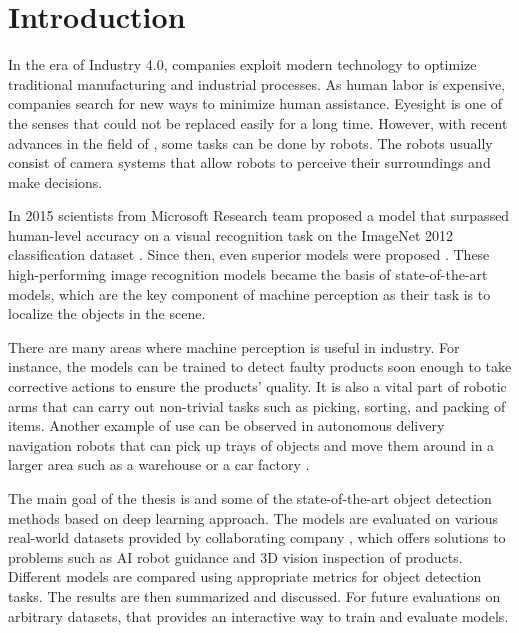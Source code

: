 \chapter{Introduction}

In the era of Industry 4.0, companies exploit modern technology to optimize
traditional manufacturing and industrial processes. As human labor is expensive,
companies search for new ways to minimize human assistance. Eyesight is one of
the senses that could not be replaced easily for a long time. However, with
recent advances in the field of , some tasks can be done by
robots. The robots usually consist of camera systems that allow robots to
perceive their surroundings and make decisions.

In 2015 scientists from Microsoft Research team proposed a 
model \cite{surp2015} that surpassed human-level accuracy on a visual
recognition task on the ImageNet 2012 classification dataset \cite{imagenet}.
Since then, even superior models were proposed \cite{resnet, efficientnet}.
These high-performing image recognition models became the basis of
state-of-the-art  models, which are the key component of
machine perception as their task is to localize the objects in the scene.

There are many areas where machine perception is useful in industry. For
instance, the models can be trained to detect faulty products soon enough to
take corrective actions to ensure the products' quality. It is also a vital part
of robotic arms that can carry out non-trivial tasks such as picking, sorting,
and packing of items. Another example of use can be observed in autonomous
delivery navigation robots that can pick up trays of objects and move them
around in a larger area such as a warehouse or a car factory \cite{bmw}.

The main goal of the thesis is  and  some of
the state-of-the-art object detection methods based on deep learning approach.
The models are evaluated on various real-world datasets provided by
collaborating company , which offers solutions to problems
such as AI robot guidance and 3D vision inspection of products. Different models
are compared using appropriate metrics for object detection tasks. The results
are then summarized and discussed. For future evaluations on arbitrary datasets,
 that provides an interactive way to train
and evaluate models.


